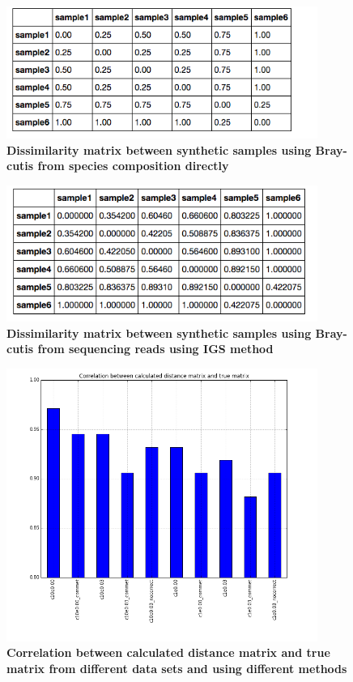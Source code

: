 

\begin{figure}[!ht]
 \centerline{\includegraphics[width=4in]{./figures/simulated_real_matrix.png}}
\caption{\bf Dissimilarity matrix between synthetic samples using Bray-cutis from species composition directly }
\label{fig:simulated_real_matrix}
\end{figure}


\begin{figure}[!ht]
 \centerline{\includegraphics[width=4in]{./figures/simulated_matrix1.png}}
\caption{\bf Dissimilarity matrix between synthetic samples using Bray-cutis from sequencing reads using IGS method }
\label{fig:simulated_matrix1}
\end{figure}

\begin{figure}[!ht]
 \centerline{\includegraphics[width=4in]{./figures/IGS_correlation_methods.png}}
\caption{\bf Correlation between calculated distance matrix and true matrix from different data sets and using different methods}
\label{fig:IGS_correlation_methods}
\end{figure}


